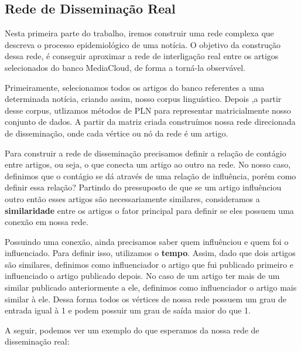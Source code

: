 \documentclass[a4paper,12pt]{article}
\begin{document}
\subsection{Rede de Disseminação Real}

Nesta primeira parte do trabalho, iremos construir uma rede complexa que descreva o processo epidemiológico de uma notícia. O objetivo
da construção dessa rede, é conseguir aproximar a rede de interligação real entre os artigos selecionados do banco
MediaCloud, de forma a torná-la observável.

Primeiramente, selecionamos todos os artigos do banco referentes a uma determinada notícia, criando assim, nosso corpus linguístico.
Depois ,a partir desse corpus, utlizamos métodos de PLN para representar matricialmente nosso conjunto de dados. A partir da matriz 
criada construímos nossa rede direcionada de disseminação, onde cada vértice ou nó da rede é um artigo.

Para construir a rede de disseminação precisamos definir a relação de contágio entre artigos, ou seja, o que conecta um artigo ao outro 
na rede. No nosso caso, definimos que o contágio se dá através de uma relação de influência, porém como definir essa relação? Partindo do
pressuposto de que se um artigo influênciou outro então esses artigos são necessariamente similares, consideramos a \textbf{similaridade}
entre os artigos o fator principal para definir se eles possuem uma conexão em nossa rede.

Possuindo uma conexão, ainda precisamos saber quem influênciou e quem foi o influenciado. Para definir isso, utilizamos o \textbf{tempo}.
Assim, dado que dois artigos são similares, definimos como influenciador o artigo que fui publicado primeiro e influenciado o artigo publicado
depois. No caso de um artigo ter mais de um similar publicado anteriormente a ele, definimos como influenciador o artigo
mais similar à ele. Dessa forma todos os vértices de nossa rede possuem um grau de entrada igual à 1 e podem possuir um grau de saída maior
do que 1.

A seguir, podemos ver um exemplo do que esperamos da nossa rede de disseminação real:
\end{document}
